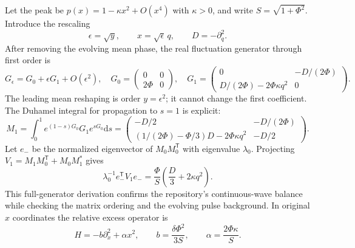 \documentclass[11pt,a4paper]{article}
\newcommand{\dd}{\mathrm d}
\newcommand{\lzero}{\lambda_0}
\begin{document}
Let the peak be $p(x)=1-\kappa x^2+O(x^4)$ with $\kappa>0$, and write $S=\sqrt{1+\Phi^2}$. Introduce the rescaling
\begin{equation}
\epsilon=\sqrt y,\qquad x=\sqrt\epsilon\,q,\qquad D=-\partial_q^2.
\end{equation}
After removing the evolving mean phase, the real fluctuation generator through first order is
\begin{equation}
G_\epsilon=G_0+\epsilon G_1+O(\epsilon^2),\quad
G_0=\begin{pmatrix}0&0\\2\Phi&0\end{pmatrix},\quad
G_1=\begin{pmatrix}
0&-D/(2\Phi)\\D/(2\Phi)-2\Phi\kappa q^2&0
\end{pmatrix}.
\end{equation}
The leading mean reshaping is order $y=\epsilon^2$; it cannot change the first coefficient. The Duhamel integral for propagation to $s=1$ is explicit:
\begin{equation}
M_1=\int_0^1e^{(1-s)G_0}G_1e^{sG_0}\dd s
=\begin{pmatrix}
-D/2&-D/(2\Phi)\\
(1/(2\Phi)-\Phi/3)D-2\Phi\kappa q^2&-D/2
\end{pmatrix}.
\end{equation}
Let $e_-$ be the normalized eigenvector of $M_0M_0^{\mathsf T}$ with eigenvalue $\lzero$. Projecting $V_1=M_1M_0^{\mathsf T}+M_0M_1^*$ gives
\begin{equation}\label{eq:effective}
\boxed{\lzero^{-1}e_-^{\mathsf T}V_1e_-
=\frac{\Phi}{S}\left(\frac D3+2\kappa q^2\right).}
\end{equation}
This full-generator derivation confirms the repository's continuous-wave balance while checking the matrix ordering and the evolving pulse background. In original $x$ coordinates the relative excess operator is
\begin{equation}\label{eq:osc}
H=-b\partial_x^2+\alpha x^2,\qquad
b=\frac{\delta\Phi^2}{3S},\qquad \alpha=\frac{2\Phi\kappa}{S}.
\end{equation}
\end{document}
